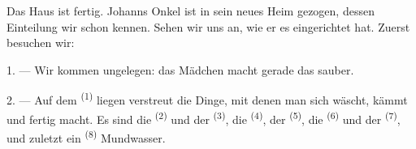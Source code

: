 %
%

\VUsaut{6.0mm}
\VUsaut{1.4mm}
\VUsaut{0.4mm}
\VUsaut{2.2mm}

Das Haus ist fertig. Johanns Onkel ist in sein neues Heim gezogen, dessen
Einteilung wir schon kennen. Sehen wir uns an, wie er es eingerichtet hat. Zuerst
besuchen wir:

\VUsaut{3.0mm}

1. --- Wir kommen ungelegen: das Mädchen macht gerade das  sauber.

2. --- Auf dem  \textsuperscript{(1)} liegen verstreut die Dinge,
mit denen man sich wäscht, kämmt und fertig macht. Es sind die
 \textsuperscript{(2)} und der 
\textsuperscript{(3)}, die  \textsuperscript{(4)}, der
 \textsuperscript{(5)}, die  \textsuperscript{(6)} und der
 \textsuperscript{(7)}, und zuletzt ein 
\textsuperscript{(8)} Mundwasser.


